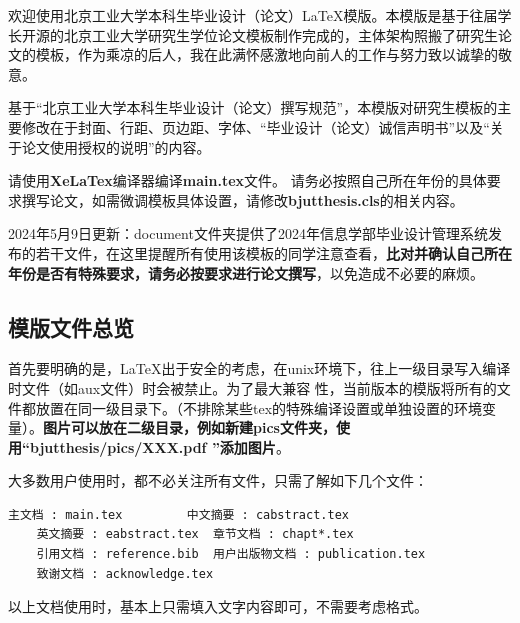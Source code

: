 \label{chap:intro}
\linespread{1.08}\selectfont


欢迎使用北京工业大学本科生毕业设计（论文）\LaTeX 模版。本模版是基于往届学长开源的北京工业大学研究生学位论文模板制作完成的，主体架构照搬了研究生论文的模板，作为乘凉的后人，我在此满怀感激地向前人的工作与努力致以诚挚的敬意。

基于“北京工业大学本科生毕业设计（论文）撰写规范”，本模版对研究生模板的主要修改在于封面、行距、页边距、字体、“毕业设计（论文）诚信声明书”以及“关于论文使用授权的说明”的内容。

请使用\textbf{{\color{red}XeLaTex}}编译器编译\textbf{{\color{red}main.tex}}文件。
请务必按照自己所在年份的具体要求撰写论文，如需微调模板具体设置，请修改\textbf{{\color{red}bjutthesis.cls}}的相关内容。

2024年5月9日更新：document文件夹提供了2024年信息学部毕业设计管理系统发布的若干文件，在这里提醒所有使用该模板的同学注意查看，\textbf{{\color{red}比对并确认自己所在年份是否有特殊要求，请务必按要求进行论文撰写}}，以免造成不必要的麻烦。



\label{sec:fst}

\subsection{模版文件总览}
首先要明确的是，\LaTeX 出于安全的考虑，在unix环境下，往上一级目录写入编译时文件（如aux文件）时会被禁止。为了最大兼容
性，当前版本的模版将所有的文件都放置在同一级目录下。（不排除某些tex的特殊编译设置或单独设置的环境变量）。\textbf{{\color{blue}图片可以放在二级目录，例如新建pics文件夹，使用“{bjutthesis/pics/XXX.pdf} ”添加图片}}。

大多数用户使用时，都不必关注所有文件，只需了解如下几个文件：

\begin{center}
  \begin{minipage}{0.95\textwidth}
    \begin{Verbatim}[frame=single]
    主文档 : main.tex         中文摘要 : cabstract.tex
    英文摘要 : eabstract.tex  章节文档 : chapt*.tex
    引用文档 : reference.bib  用户出版物文档 : publication.tex
    致谢文档 : acknowledge.tex
    \end{Verbatim}
  \end{minipage}
\end{center}

以上文档使用时，基本上只需填入文字内容即可，不需要考虑格式。

